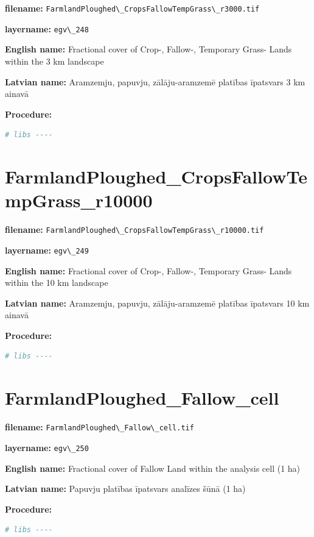 \documentclass[
]{book}
\newcommand{\passthrough}[1]{#1}
\begin{document}
\textbf{filename:} \passthrough{\lstinline!FarmlandPloughed\_CropsFallowTempGrass\_r3000.tif!}

\textbf{layername:} \passthrough{\lstinline!egv\_248!}

\textbf{English name:} Fractional cover of Crop-, Fallow-, Temporary Grass- Lands within the 3 km landscape

\textbf{Latvian name:} Aramzemju, papuvju, zālāju-aramzemē platības īpatsvars 3 km ainavā

\textbf{Procedure:}

\begin{lstlisting}[language=R]
# libs ----
\end{lstlisting}

\section{FarmlandPloughed\_CropsFallowTempGrass\_r10000}\label{ch06.249}

\textbf{filename:} \passthrough{\lstinline!FarmlandPloughed\_CropsFallowTempGrass\_r10000.tif!}

\textbf{layername:} \passthrough{\lstinline!egv\_249!}

\textbf{English name:} Fractional cover of Crop-, Fallow-, Temporary Grass- Lands within the 10 km landscape

\textbf{Latvian name:} Aramzemju, papuvju, zālāju-aramzemē platības īpatsvars 10 km ainavā

\textbf{Procedure:}

\begin{lstlisting}[language=R]
# libs ----
\end{lstlisting}

\section{FarmlandPloughed\_Fallow\_cell}\label{ch06.250}

\textbf{filename:} \passthrough{\lstinline!FarmlandPloughed\_Fallow\_cell.tif!}

\textbf{layername:} \passthrough{\lstinline!egv\_250!}

\textbf{English name:} Fractional cover of Fallow Land within the analysis cell (1 ha)

\textbf{Latvian name:} Papuvju platības īpatsvars analīzes šūnā (1 ha)

\textbf{Procedure:}

\begin{lstlisting}[language=R]
# libs ----
\end{lstlisting}
\end{document}
